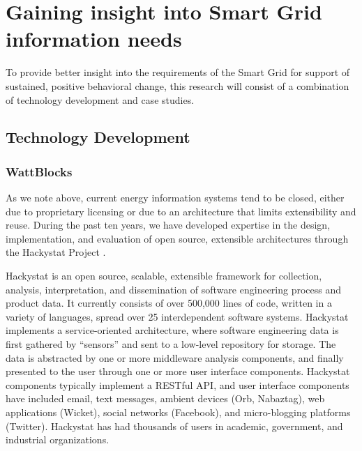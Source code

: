 \section{Gaining insight into Smart Grid information needs}
\label{sec:methodology}

To provide better insight into the requirements of the Smart Grid for
support of sustained, positive behavioral change, this research will
consist of a combination of  technology development and case studies.

\subsection{Technology Development}

\subsubsection{WattBlocks}

As we note above, current energy information systems tend to be closed,
either due to proprietary licensing or due to an architecture that limits
extensibility and reuse.  During the past ten years, we have developed
expertise in the design, implementation, and evaluation of open source,
extensible architectures through the Hackystat Project \cite{csdl2-09-02,csdl2-09-07,csdl2-09-01,csdl2-06-06}.  

Hackystat is an open source, scalable, extensible framework for collection,
analysis, interpretation, and dissemination of software engineering process
and product data.  It currently consists of over 500,000 lines of code,
written in a variety of languages, spread over 25 interdependent software
systems.  Hackystat implements a service-oriented architecture, where
software engineering data is first gathered by ``sensors'' and sent to a
low-level repository for storage.  The data is abstracted by one or more
middleware analysis components, and finally presented to the user through
one or more user interface components.  Hackystat components typically
implement a RESTful API, and user interface components have
included email, text messages, ambient devices (Orb, Nabaztag), web applications (Wicket),
social networks (Facebook), and micro-blogging platforms (Twitter).
Hackystat has had thousands of users in academic, government, and
industrial organizations.

